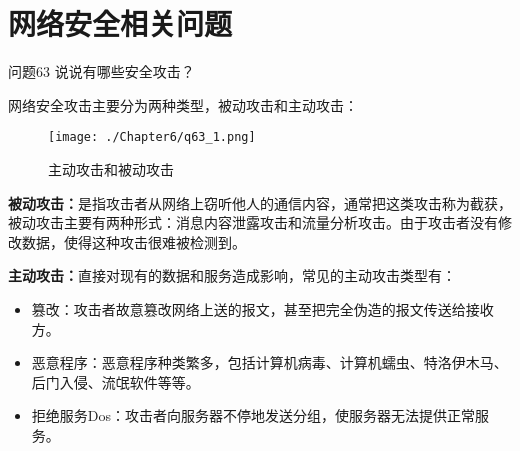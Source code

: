 \documentclass[cn,11pt,color=blue,lang=cn]{elegantbook}
\begin{document}
\chapter{网络安全相关问题}
\begin{custom}{问题63}
说说有哪些安全攻击？
\end{custom}
\begin{solution}

网络安全攻击主要分为两种类型，被动攻击和主动攻击：
\begin{figure}[!h]
\centering
\texttt{[image: ./Chapter6/q63\_1.png]}
\caption{主动攻击和被动攻击}
\label{fig63_1}
\end{figure}

\textbf{被动攻击：}是指攻击者从网络上窃听他人的通信内容，通常把这类攻击称为截获，被动攻击主要有两种形式：消息内容泄露攻击和流量分析攻击。由于攻击者没有修改数据，使得这种攻击很难被检测到。

\textbf{主动攻击：}直接对现有的数据和服务造成影响，常见的主动攻击类型有：
\begin{itemize}
	\item 篡改：攻击者故意篡改网络上送的报文，甚至把完全伪造的报文传送给接收方。
	\item 恶意程序：恶意程序种类繁多，包括计算机病毒、计算机蠕虫、特洛伊木马、后门入侵、流氓软件等等。
	\item 拒绝服务Dos：攻击者向服务器不停地发送分组，使服务器无法提供正常服务。
\end{itemize}

\end{solution}
\end{document}
